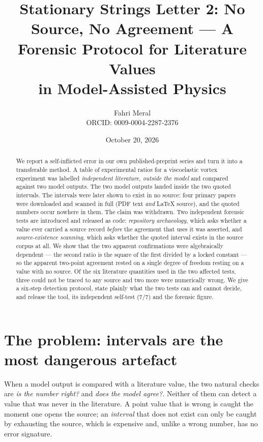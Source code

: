 \documentclass[11pt,a4paper]{article}
\title{\textbf{Stationary Strings Letter 2: No Source, No Agreement --- A Forensic Protocol for Literature Values\\
in Model-Assisted Physics}}
\author{Fahri Meral\\[0.2em]\small ORCID: 0009-0004-2287-2376}
\date{October 20, 2026}
\begin{document}
\maketitle

\begin{abstract}
We report a self-inflicted error in our own published-preprint series and
turn it into a transferable method. A table of experimental ratios for a
viscoelastic vortex experiment was labelled \emph{independent literature,
outside the model} and compared against two model outputs. The two model
outputs landed inside the two quoted intervals. The intervals were later
shown to exist in no source: four primary papers were downloaded and scanned
in full (PDF text \emph{and} LaTeX source), and the quoted numbers occur
nowhere in them. The claim was withdrawn. Two independent forensic tests are
introduced and released as code: \emph{repository archaeology}, which asks
whether a value ever carried a source record \emph{before} the agreement
that uses it was asserted, and \emph{source-existence scanning}, which asks
whether the quoted interval exists in the source corpus at all. We show that
the two apparent confirmations were algebraically dependent --- the second
ratio is the square of the first divided by a locked constant --- so the
apparent two-point agreement rested on a single degree of freedom resting
on a value with no source. Of the six literature quantities used in the two
affected tests, three could not be traced to any source and two more were
numerically wrong. We give a six-step detection protocol, state plainly what
the two tests can and cannot decide, and release the tool, its independent
self-test (7/7) and the forensic figure.
\end{abstract}

\section{The problem: intervals are the most dangerous artefact}
When a model output is compared with a literature value, the two natural
checks are \emph{is the number right?} and \emph{does the model agree?}.
Neither of them can detect a value that was never in the literature. A point
value that is wrong is caught the moment one opens the source; an
\emph{interval} that does not exist can only be caught by exhausting the
source, which is expensive and, unlike a wrong number, has no error
signature.
\end{document}
